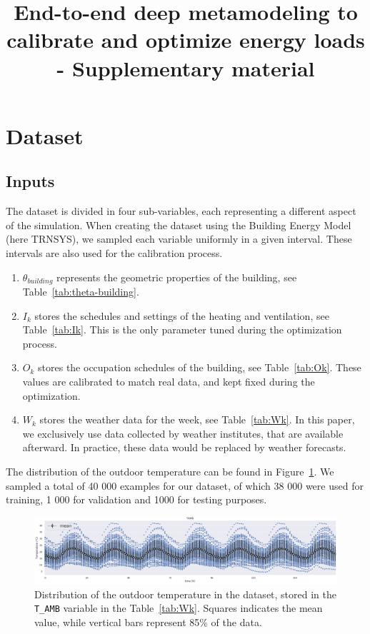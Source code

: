 \documentclass{article}
\title{End-to-end deep metamodeling to calibrate and optimize energy loads - Supplementary material}
\begin{document}
\maketitle

\section{Dataset}
\subsection{Inputs}
The dataset is divided in four sub-variables, each representing a different aspect of the simulation. When creating the dataset using the Building Energy Model (here TRNSYS), we sampled each variable uniformly in a given interval. These intervals  are also used for the calibration process.

\begin{enumerate}[-]
    \item $\theta_{building}$ represents the geometric properties of the building, see Table~\ref{tab:theta-building}.
    \item $I_k$ stores the schedules and settings of the heating and ventilation, see  Table~\ref{tab:Ik}. This is the only parameter tuned during the optimization process.
    \item $O_k$ stores the occupation schedules of the building, see Table~\ref{tab:Ok}. These values are calibrated to match real data, and kept fixed during the optimization.
    \item $W_k$ stores the weather data for the week, see Table~\ref{tab:Wk}. In this paper, we exclusively use data collected by weather institutes, that are available afterward. In practice, these data would be replaced by weather forecasts.
\end{enumerate}

The distribution of the outdoor temperature can be found in Figure~\ref{fig:dataset_input_distribution}. We sampled a total of 40 000 examples for our dataset, of which 38 000 were used for training, 1 000 for validation and 1000 for testing purposes.

\begin{figure}
    \centering
    \includegraphics[width=\textwidth]{dataset_distribution_Z_168h.png}
    \caption{Distribution of the outdoor temperature in the dataset, stored in the \texttt{T\_AMB} variable in the Table~\ref{tab:Wk}. Squares indicates the mean value, while vertical bars represent 85\% of the data.}
    \label{fig:dataset_input_distribution}
\end{figure}
\end{document}
